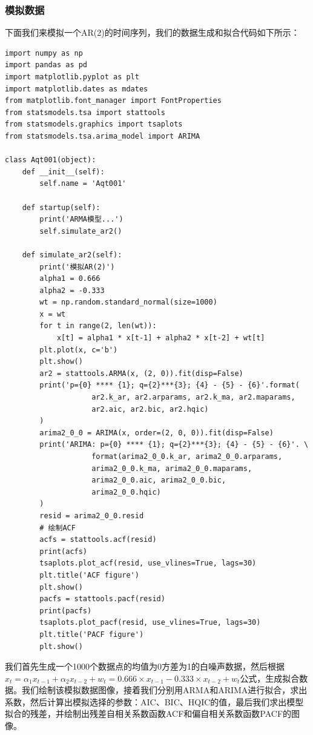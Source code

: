 \documentclass{article}
\begin{document}
\subsubsection{模拟数据}
下面我们来模拟一个AR(2)的时间序列，我们的数据生成和拟合代码如下所示：
\begin{lstlisting}
import numpy as np
import pandas as pd
import matplotlib.pyplot as plt
import matplotlib.dates as mdates
from matplotlib.font_manager import FontProperties
from statsmodels.tsa import stattools
from statsmodels.graphics import tsaplots
from statsmodels.tsa.arima_model import ARIMA

class Aqt001(object):
    def __init__(self):
        self.name = 'Aqt001'
        
    def startup(self):
        print('ARMA模型...')
        self.simulate_ar2()
        
    def simulate_ar2(self):
        print('模拟AR(2)')
        alpha1 = 0.666
        alpha2 = -0.333
        wt = np.random.standard_normal(size=1000)
        x = wt
        for t in range(2, len(wt)):
            x[t] = alpha1 * x[t-1] + alpha2 * x[t-2] + wt[t]
        plt.plot(x, c='b')
        plt.show()
        ar2 = stattools.ARMA(x, (2, 0)).fit(disp=False)
        print('p={0} **** {1}; q={2}***{3}; {4} - {5} - {6}'.format(
                    ar2.k_ar, ar2.arparams, ar2.k_ma, ar2.maparams, 
                    ar2.aic, ar2.bic, ar2.hqic)
        )
        arima2_0_0 = ARIMA(x, order=(2, 0, 0)).fit(disp=False)
        print('ARIMA: p={0} **** {1}; q={2}***{3}; {4} - {5} - {6}'. \
                    format(arima2_0_0.k_ar, arima2_0_0.arparams, 
                    arima2_0_0.k_ma, arima2_0_0.maparams, 
                    arima2_0_0.aic, arima2_0_0.bic, 
                    arima2_0_0.hqic)
        )
        resid = arima2_0_0.resid
        # 绘制ACF
        acfs = stattools.acf(resid)
        print(acfs)
        tsaplots.plot_acf(resid, use_vlines=True, lags=30)
        plt.title('ACF figure')
        plt.show()
        pacfs = stattools.pacf(resid)
        print(pacfs)
        tsaplots.plot_pacf(resid, use_vlines=True, lags=30)
        plt.title('PACF figure')
        plt.show()
\end{lstlisting}
我们首先生成一个1000个数据点的均值为0方差为1的白噪声数据，然后根据$x_{t}=\alpha _{1}x_{t-1} + \alpha _{2}x_{t-2} + w_{t}=0.666 \times x_{t-1} - 0.333 \times x_{t-2} + w_{t}$公式，生成拟合数据。我们绘制该模拟数据图像，接着我们分别用ARMA和ARIMA进行拟合，求出系数，然后计算出模拟选择的参数：AIC、BIC、HQIC的值，最后我们求出模型拟合的残差，并绘制出残差自相关系数函数ACF和偏自相关系数函数PACF的图像。
\end{document}
